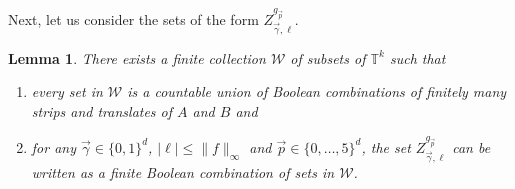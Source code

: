\documentclass[12pt,a4paper]{amsart}
\numberwithin{equation}{section}
\newtheorem{lemma}[equation]{Lemma}
\theoremstyle{definition}
\begin{document}
Next, let us consider the sets of the form $Z_{\vec{\gamma},\ell}^{g_{\vec{p}}}$.


\begin{lemma}
\label{lem:Zpcomplexity}
There exists a finite collection $\mathcal{W}$ of subsets of $\mathbb{T}^k$ such that
\begin{enumerate}
\item\label{eq:Wgood} every set in $\mathcal{W}$ is a countable union of Boolean combinations of finitely many strips and translates of $A$ and $B$ and
\item\label{eq:ZW} for any $\vec{\gamma}\in\{0,1\}^d$, $|\ell|\leq \|f\|_\infty$ and $\vec{p}\in\{0,\dots,5\}^d$, the set $Z_{\vec{\gamma},\ell}^{g_{\vec{p}}}$ can be written as a finite Boolean combination of sets in $\mathcal{W}$.
\end{enumerate}
\end{lemma}
\end{document}
